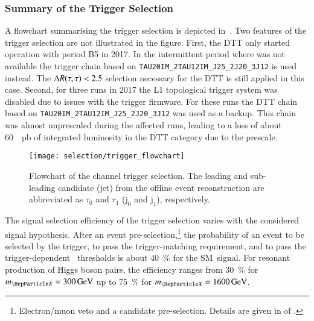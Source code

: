 \subsubsection{Summary of the Trigger Selection}

A flowchart summarising the trigger selection is depicted
in~. Two features of the trigger selection
are not illustrated in the figure. First, the \LOneTopo DTT only started
operation with period B5 in 2017. In the intermittent period where \LOneTopo was
not available the \tauhadvis trigger chain based on
\texttt{TAU20IM\_2TAU12IM\_J25\_2J20\_3J12} is used instead. The
$\Delta R(\tau, \tau) < 2.5$ selection necessary for the \LOneTopo DTT is still applied in
this case. Second, for three runs in 2017 the L1 topological trigger system was
disabled due to issues with the trigger firmware. For these runs the DTT chain
based on \texttt{TAU20IM\_2TAU12IM\_J25\_2J20\_3J12} was used as a backup. This
chain was almost unprescaled during the affected runs, leading to a loss of
about \SI{60}{\per\pico\barn} of integrated luminosity in the \LOneTopo DTT
category due to the prescale.

\begin{figure}[htbp]
  \centering

  \texttt{[image: selection/trigger\_flowchart]}

  \caption[Flowchart of the \hadhad channel trigger selection.]{Flowchart of the
    \hadhad channel trigger selection. The leading and sub-leading \tauhadvis
    candidate (jet) from the offline event reconstruction are abbreviated as
    $\tau_0$ and $\tau_1$ ($\text{j}_0$ and $\text{j}_1$), respectively.}%
  \label{fig:trigger_selection_flowchart}
\end{figure}

The signal selection efficiency of the trigger selection varies with the
considered signal hypothesis. After an event
pre-selection,\footnote{Electron/muon veto and a \tauhadvis candidate
  pre-selection. Details are given in  of
  .} the probability of an event to be selected by
the trigger, to pass the trigger-matching requirement, and to pass the
trigger-dependent \tauhadvis~\pT thresholds is about \SI{40}{\percent} for the
SM~\HH signal. For resonant production of Higgs boson pairs, the efficiency
ranges from \SI{30}{\percent} for $\mX = \SI{300}{\GeV}$ up to \SI{75}{\percent}
for $\mX = \SI{1600}{\GeV}$.


